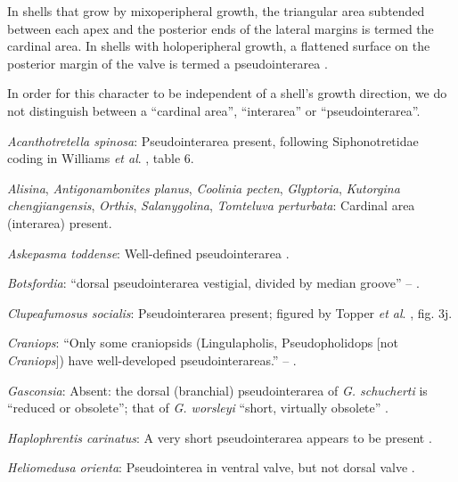 \documentclass[openany]{book}
\theoremstyle{definition}
\theoremstyle{definition}
\theoremstyle{definition}
\theoremstyle{remark}
\begin{document}
In shells that grow by mixoperipheral growth, the triangular area
subtended between each apex and the posterior ends of the lateral
margins is termed the cardinal area. In shells with holoperipheral
growth, a flattened surface on the posterior margin of the valve is
termed a pseudointerarea
\citep[paraphrasing][]{Williams1997Introduction}.

In order for this character to be independent of a shell's growth
direction, we do not distinguish between a ``cardinal area'',
``interarea'' or ``pseudointerarea''.

\hypertarget{Acanthotretella_spinosa-coding-85}{}
\emph{Acanthotretella spinosa}: Pseudointerarea present, following
Siphonotretidae coding in Williams \emph{et al}.
\citeyearpar{Williams2000LinguliformeaCraniiformea}, table 6.

\hypertarget{Alisina-coding-85}{}
\emph{Alisina}, \emph{Antigonambonites planus}, \emph{Coolinia pecten},
\emph{Glyptoria}, \emph{Kutorgina chengjiangensis}, \emph{Orthis},
\emph{Salanygolina}, \emph{Tomteluva perturbata}: Cardinal area
(interarea) present.

\hypertarget{Askepasma_toddense-coding-85}{}
\emph{Askepasma toddense}: Well-defined pseudointerarea
\citep[p153]{Williams2000LinguliformeaCraniiformea}.

\hypertarget{Botsfordia-coding-85}{}
\emph{Botsfordia}: ``dorsal pseudointerarea vestigial, divided by median
groove'' -- \citet{Williams2000LinguliformeaCraniiformea}.

\hypertarget{Clupeafumosus_socialis-coding-85}{}
\emph{Clupeafumosus socialis}: Pseudointerarea present; figured by
Topper \emph{et al}. \citeyearpar{Topper2013Reappraisalof}, fig. 3j.

\hypertarget{Craniops-coding-85}{}
\emph{Craniops}: ``Only some craniopsids (Lingulapholis, Pseudopholidops
{[}not \emph{Craniops}{]}) have well-developed pseudointerareas.'' --
\citet{Williams2000LinguliformeaCraniiformea}.

\hypertarget{Gasconsia-coding-85}{}
\emph{Gasconsia}: Absent: the dorsal (branchial) pseudointerarea of
\emph{G. schucherti} is ``reduced or obsolete''; that of \emph{G.
worsleyi} ``short, virtually obsolete'' \citep{Hanken1985Thetaxonomy}.

\hypertarget{Haplophrentis_carinatus-coding-85}{}
\emph{Haplophrentis carinatus}: A very short pseudointerarea appears to
be present \citep{Moysiuk2017Hyolithsare}.

\hypertarget{Heliomedusa_orienta-coding-85}{}
\emph{Heliomedusa orienta}: Pseudointerea in ventral valve, but not
dorsal valve \citep[2007]{Williams2000LinguliformeaCraniiformea}.
\end{document}

